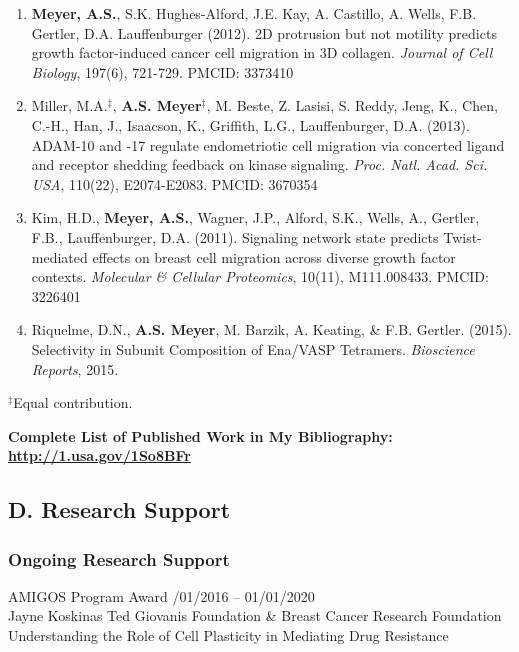 \documentclass[11pt]{article}
\begin{document}
\begin{enumerate}
  \item \textbf{Meyer, A.S.}, S.K. Hughes-Alford, J.E. Kay, A. Castillo, A. Wells, F.B. Gertler, D.A. Lauffenburger (2012). 2D protrusion but not motility predicts growth factor-induced cancer cell migration in 3D collagen. \emph{Journal of Cell Biology}, 197(6), 721-729. PMCID: 3373410
  \item Miller, M.A.$^\ddag$, \textbf{A.S. Meyer}$^\ddag$, M. Beste, Z. Lasisi, S. Reddy, Jeng, K., Chen, C.-H., Han, J., Isaacson, K., Griffith, L.G., Lauffenburger, D.A. (2013). ADAM-10 and -17 regulate endometriotic cell migration via concerted ligand and receptor shedding feedback on kinase signaling. \emph{Proc. Natl. Acad. Sci. USA}, 110(22), E2074-E2083. PMCID: 3670354
  \item Kim, H.D., \textbf{Meyer, A.S.}, Wagner, J.P., Alford, S.K., Wells, A., Gertler, F.B., Lauffenburger, D.A. (2011). Signaling network state predicts Twist-mediated effects on breast cell migration across diverse growth factor contexts. \emph{Molecular \& Cellular Proteomics}, 10(11), M111.008433. PMCID: 3226401
  \item Riquelme, D.N., \textbf{A.S. Meyer}, M. Barzik, A. Keating, \& F.B. Gertler. (2015). Selectivity in Subunit Composition of Ena/VASP Tetramers. \emph{Bioscience Reports}, 2015.
\end{enumerate}

\noindent $^\ddag$Equal contribution.




\textbf{Complete List of Published Work in My Bibliography: \url{http://1.usa.gov/1So8BFr}}





\cleardoublepage

\subsection{D. Research Support}

\subsubsection{Ongoing Research Support}

AMIGOS Program Award \tab {}/01/2016 -- 01/01/2020 \\
Jayne Koskinas Ted Giovanis Foundation \& Breast Cancer Research Foundation\\
Understanding the Role of Cell Plasticity in Mediating Drug Resistance
\end{document}
